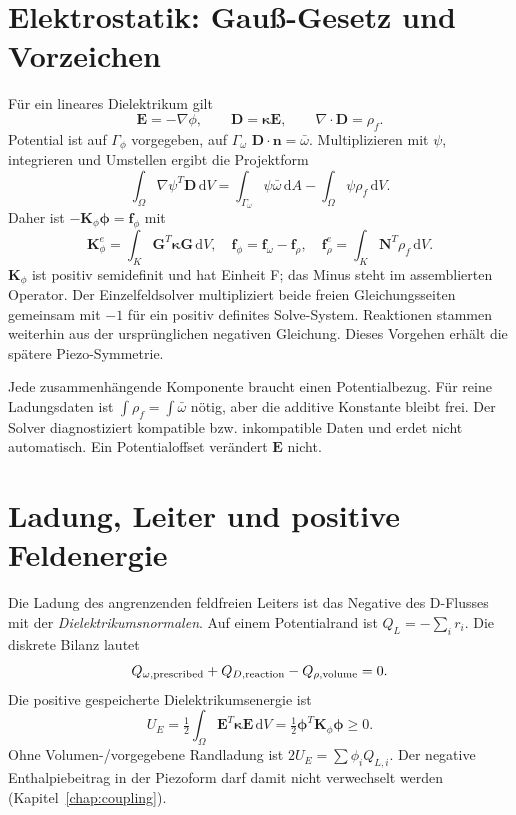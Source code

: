 \section{Elektrostatik: Gauß-Gesetz und Vorzeichen}
Für ein lineares Dielektrikum gilt
\begin{equation}\label{eq:electro-strong}
\mathbf E=-\nabla\phi,\qquad\mathbf D=\boldsymbol\kappa\mathbf E,
\qquad\nabla\cdot\mathbf D=\rho_f.
\end{equation}
Potential ist auf $\Gamma_\phi$ vorgegeben, auf $\Gamma_\omega$
$\mathbf D\cdot\mathbf n=\bar\omega$. Multiplizieren mit $\psi$, integrieren
und Umstellen ergibt die Projektform
\begin{equation}\label{eq:electro-weak}
\int_\Omega\nabla\psi^T\mathbf D\,\mathrm dV
=\int_{\Gamma_\omega}\psi\bar\omega\,\mathrm dA-
\int_\Omega\psi\rho_f\,\mathrm dV.
\end{equation}
Daher ist $-\mathbf K_\phi\boldsymbol\phi=\mathbf f_\phi$ mit
\begin{equation}\label{eq:dielectric}
\mathbf K_\phi^e=\int_K\mathbf G^T\boldsymbol\kappa\mathbf G\,\mathrm dV,
\quad\mathbf f_\phi=\mathbf f_\omega-\mathbf f_\rho,
\quad\mathbf f_\rho^e=\int_K\mathbf N^T\rho_f\,\mathrm dV.
\end{equation}
$\mathbf K_\phi$ ist positiv semidefinit und hat Einheit F; das Minus steht
im assemblierten Operator. Der Einzelfeldsolver multipliziert beide freien
Gleichungsseiten gemeinsam mit $-1$ für ein positiv definites Solve-System.
Reaktionen stammen weiterhin aus der ursprünglichen negativen Gleichung.
Dieses Vorgehen erhält die spätere Piezo-Symmetrie.

Jede zusammenhängende Komponente braucht einen Potentialbezug. Für reine
Ladungsdaten ist $\int\rho_f=\int\bar\omega$ nötig, aber die additive Konstante
bleibt frei. Der Solver diagnostiziert kompatible bzw. inkompatible Daten
und erdet nicht automatisch. Ein Potentialoffset verändert $\mathbf E$ nicht.

\section{Ladung, Leiter und positive Feldenergie}
Die Ladung des angrenzenden feldfreien Leiters ist das Negative des
D-Flusses mit der \emph{Dielektrikumsnormalen}. Auf einem Potentialrand ist
$Q_L=-\sum_i r_i$. Die diskrete Bilanz lautet
\begin{equation}\label{eq:charge-balance}
Q_{\omega,\rm prescribed}+Q_{D,\rm reaction}-Q_{\rho,\rm volume}=0.
\end{equation}
Die positive gespeicherte Dielektrikumsenergie ist
\begin{equation}\label{eq:electric-energy}
U_E=\tfrac12\int_\Omega\mathbf E^T\boldsymbol\kappa\mathbf E\,\mathrm dV
=\tfrac12\boldsymbol\phi^T\mathbf K_\phi\boldsymbol\phi\ge0.
\end{equation}
Ohne Volumen-/vorgegebene Randladung ist $2U_E=\sum\phi_i Q_{L,i}$.
Der negative Enthalpiebeitrag in der Piezoform darf damit nicht verwechselt
werden (Kapitel~\ref{chap:coupling}).

